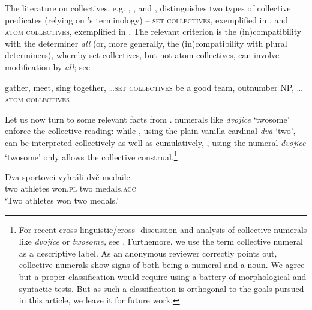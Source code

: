 \documentclass[output=paper,colorlinks,citecolor=brown,newtxmath]{langscibook}
\begin{document}
\z

\noindent The literature on collectives, e.g. \cite{Dowty1987}, \cite{Winter2002}, and \cite{Brisson2003}, distinguishes two types of collective predicates (relying on \citeauthor{Winter2002}'s terminology) -- \textsc{set collectives}, exemplified in , and \textsc{atom collectives}, exemplified in . The relevant criterion is the (in)compatibility with the determiner \textit{all} (or, more generally, the (in)compatibility with plural determiners), whereby set collectives, but not atom collectives, can involve modification by \textit{all}; see .

\ea \ea\label{ex:line241-a} gather, meet, sing together, \ldots{}\hfill \textsc{set collectives}
\ex\label{ex:line241-b} be a good team, outnumber NP, \ldots{}\hfill \textsc{atom collectives}
\z\z

\ea\label{ex:line246}
\z\z

\noindent Let us now turn to some relevant facts from .  numerals like \textit{dvojice} `twosome' enforce the collective reading: while , using the plain-vanilla cardinal \textit{dva} `two', can be interpreted collectively as well as cumulatively, , using the numeral \textit{dvojice} `twosome' only allows the collective construal.\footnote{For recent cross-linguistic/cross- discussion and analysis of collective numerals like \textit{dvojice} or \textit{twosome,} see \citet{Grimm.Docekaltoappear}. Furthemore, we use the term collective numeral as a descriptive label. As an anonymous reviewer correctly points out,  collective numerals show signs of both being a numeral and a noun. We agree but a proper classification would require using a battery of morphological and syntactic tests. But as such a classification is orthogonal to the goals pursued in this article, we leave it for future work.}

\ea\label{ex:line256-a}\gll Dva sportovci vyhráli dvě medaile.\\
two athletes won.\textsc{pl} two medals.\textsc{acc}\\
\glt `Two athletes won two medals.'\\
\z\z
\end{document}
